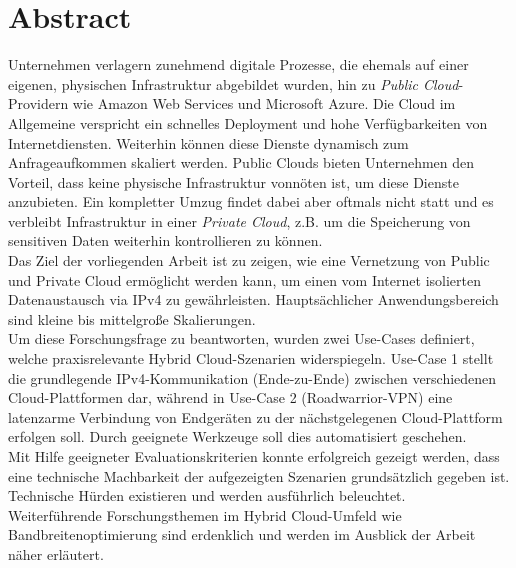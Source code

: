 \chapter{Abstract}
Unternehmen verlagern zunehmend digitale Prozesse, die ehemals auf einer eigenen, physischen Infrastruktur abgebildet wurden, hin zu \textit{Public Cloud}-Providern wie Amazon Web Services und Microsoft Azure. Die Cloud im Allgemeine verspricht ein schnelles Deployment und hohe Verfügbarkeiten von Internetdiensten. Weiterhin können diese Dienste dynamisch zum Anfrageaufkommen skaliert werden. Public Clouds bieten Unternehmen den Vorteil, dass keine physische Infrastruktur vonnöten ist, um diese Dienste anzubieten. Ein kompletter Umzug findet dabei aber oftmals nicht statt und es verbleibt Infrastruktur in einer \textit{Private Cloud}, z.B. um die Speicherung von sensitiven Daten weiterhin kontrollieren zu können.\\
Das Ziel der vorliegenden Arbeit ist zu zeigen, wie eine Vernetzung von Public und Private Cloud ermöglicht werden kann, um einen vom Internet isolierten Datenaustausch via IPv4 zu gewährleisten. Hauptsächlicher Anwendungsbereich sind kleine bis mittelgroße Skalierungen.\\
Um diese Forschungsfrage zu beantworten, wurden zwei Use-Cases definiert, welche praxisrelevante Hybrid Cloud-Szenarien widerspiegeln. Use-Case 1 stellt die grundlegende IPv4-Kommunikation (\glqq Ende-zu-Ende\grqq{}) zwischen verschiedenen Cloud-Plattformen dar, während in Use-Case 2 (\glqq Roadwarrior-VPN\grqq{}) eine latenzarme Verbindung von Endgeräten zu der nächstgelegenen Cloud-Plattform erfolgen soll. Durch geeignete Werkzeuge soll dies automatisiert geschehen.\\
Mit Hilfe geeigneter Evaluationskriterien konnte erfolgreich gezeigt werden, dass eine technische Machbarkeit der aufgezeigten Szenarien grundsätzlich gegeben ist. Technische Hürden existieren und werden ausführlich beleuchtet.\\
Weiterführende Forschungsthemen im Hybrid Cloud-Umfeld wie Bandbreitenoptimierung sind erdenklich und werden im Ausblick der Arbeit näher erläutert.\\
